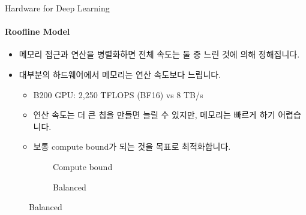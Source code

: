 \begin{frame}{Hardware for Deep Learning}
\framesubtitle{Roofline Model}

\begin{itemize}
  \item 메모리 접근과 연산을 병렬화하면 전체 속도는 둘 중 느린 것에 의해 정해집니다.
  \item 대부분의 하드웨어에서 메모리는 연산 속도보다 느립니다.
  \begin{itemize}
    \item B200 GPU: 2,250 TFLOPS (BF16) vs 8 TB/s
    \item 연산 속도는 더 큰 칩을 만들면 늘릴 수 있지만, 메모리는 빠르게 하기 어렵습니다.
    \item 보통 compute bound가 되는 것을 목표로 최적화합니다.
  \end{itemize}
\end{itemize}

\begin{figure}
  \centering
  \begin{subfigure}{0.5\textwidth}
    \resizebox{!}{2.8cm}{}
    \caption{Compute bound}
  \end{subfigure}
  \begin{subfigure}{0.45\textwidth}
    \resizebox{!}{2.8cm}{}
    \caption{Balanced}
  \end{subfigure}
\end{figure}
\end{frame}